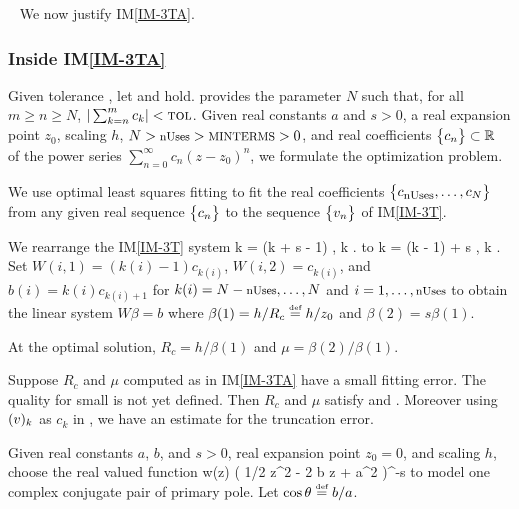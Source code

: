 \documentclass[12pt]{article}
\newcommand{\iref}[1]{IM\ref{#1}}
\begin{document}
~\newline
We now justify \iref{IM-3TA}.

\subsubsection*{Inside \iref{IM-3TA}}

Given tolerance \tol,
let  and  hold.  provides the parameter $N$ such that, for all
$m \geq n \geq N$, $| \sum_{k=n}^{m} c_k | < \text{\sc tol}$.
Given real constants $a$ and $s>0$, a real expansion point $z_0$,
scaling $h$, $N > \text{\footnotesize nUses} > \text{\footnotesize MINTERMS} > 0$, and real coefficients $\bigl\{ {c_n} \bigr\} \subset \mathbb{R}$
of the power series $\sum_{n=0}^{\infty} c_n (z-z_0)^n$, we formulate the optimization problem.

We use optimal least squares fitting to fit the real
coefficients $\bigl\{ {c_{\text{\footnotesize nUses}}, \ldots, c_N } \bigr\}$ from any given real sequence $\bigl\{ {c_n} \bigr\}$
to the sequence $\bigl\{ {v_n} \bigr\}$ of \iref{IM-3T}.

We rearrange the \iref{IM-3T} system
\EQ
{
  \label{eq:3TA}
  k  =  (k + s - 1) , \qquad {} \quad k .
}
to
\EQ
{
  k  =  (k - 1)  +  s ,
  \qquad {} \quad k .
}
Set
$W(i, 1) = (k(i)- 1) c_{k(i)}$, $W(i, 2) = c_{k(i)}$, and
$b(i) = k(i) c_{k(i) + 1}$ for $k(i)=N-\text{\footnotesize nUses}, \ldots, N$ and $i=1, \ldots, \text{\footnotesize nUses}$
to obtain the linear system $W \beta = b$ where $\beta(1) = h/R_c \stackrel{\textup{\tiny def}}{=} h/z_0$
and $\beta(2) = s \beta(1)$.

At the optimal solution, $R_c = h/\beta(1)$ and $\mu = \beta(2)/\beta(1)$.

Suppose $R_c$ and $\mu$ computed as in \iref{IM-3TA} have a small fitting error.
The quality for small is not yet defined. Then $R_c$ and $\mu$ satisfy
 and . Moreover using
$(v)_{k}$ as $c_k$ in , we have an estimate for the truncation error.

Given real constants $a$, $b$, and $s>0$, real expansion point $z_0 = 0$, and scaling $h$,
\cite{chang1982} choose the real valued function
\EQ
{
  \label{eq:model-complex-pair-pole}
  w(z)  ( 1/2 z^2 - 2 b z + a^2 )^{-s}
}
to model one complex conjugate pair of primary pole.
Let $\cos \theta \stackrel{\textup{\tiny def}}{=} b/a$.
\end{document}
